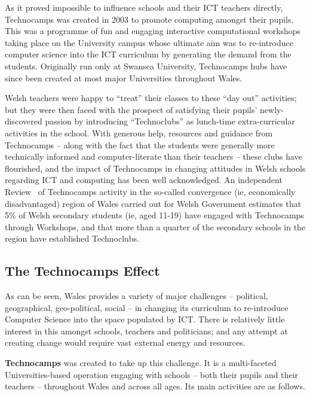 \documentclass{sig-alternate}
\begin{document}
As it proved impossible to influence schools and their ICT teachers directly,
Technocamps was created in 2003 to promote computing amongst their pupils.
This was a programme of fun and engaging interactive computational workshops
taking place on the University campus
whose ultimate aim was to re-introduce computer science into
the ICT curriculum by generating the demand from the students.
Originally run only at Swansea University,
Technocamps hubs have since been created at most major Universities
throughout Wales.

Welsh teachers were happy to ``treat'' their classes
to these ``day out'' activities; but they were then faced with
the prospect of satisfying their pupils' newly-discovered passion
by introducing ``Technoclubs'' as lunch-time
extra-curricular activities in the school.
With generous help, resources and guidance from Technocamps
-- along with the fact that the students were generally
more technically informed and computer-literate than their teachers -- 
these clubs have flourished, and the impact of Technocamps
in changing attitudes in Welsh schools regarding ICT and computing
has been well acknowledged.
An independent Review~\cite{Wavehill:2015}
of Technocamps activity in the so-called convergence
(ie, economically disadvantaged) region of Wales
carried out for Welsh Government estimates that
5\% of Welsh secondary students (ie, aged 11-19)
have engaged with Technocamps through Workshops,
and that more than a quarter of the secondary schools
in the region have established Technoclubs.


\subsection{The Technocamps Effect}

As can be seen, Wales provides a variety of major challenges
-- political, geographical, geo-political, social --
in changing its curriculum to re-introduce Computer Science
into the space populated by ICT.
There is relatively little interest in this
amongst schools, teachers and politicians;
and any attempt at creating change would require
vast external energy and resources.

\textbf{Technocamps} was created to take up this challenge.
It is a multi-faceted Universities-based
operation engaging with schools -- both their pupils and their teachers --
throughout Wales and across all ages. Its main activities are as follows.
\end{document}
